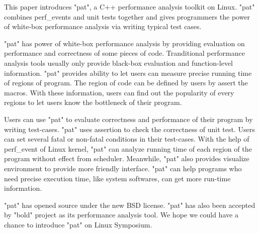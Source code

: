 This paper introduces "pat", a C++ performance analysis toolkit on Linux.
"pat" combines perf_events and unit tests together and gives programmers the power of white-box performance analysis via writing typical test cases.

"pat" has power of white-box performance analysis by providing evaluation on performance and correctness of some pieces of code.
Tranditional performance analysis tools usually only provide black-box evaluation and function-level information.
"pat" provides ability to let users can measure precise running time of regions of program. The region of code can be defined by users by assert the macros. 
With these information, users can find out the popularity of every regions to let users know the bottleneck of their program.

Users can use "pat" to evaluate correctness and performance of their program by writing test-cases.
"pat" uses assertion to check the correctness of unit test. 
Users can set several fatal or non-fatal conditions in their test-cases.
With the help of perf_event of Linux kernel, "pat" can analyze running time of each region of the program without effect from scheduler. 
Meanwhile, "pat" also provides visualize environment to provide more friendly interface.
"pat" can help programs who need precise execution time, like system softwares, can get more run-time information.

"pat" has opened source under the new BSD license. 
"pat" has also been accepted by "bold" project as its performance analysis tool.
We hope we could have a chance to introduce "pat" on Linux Symposium.
